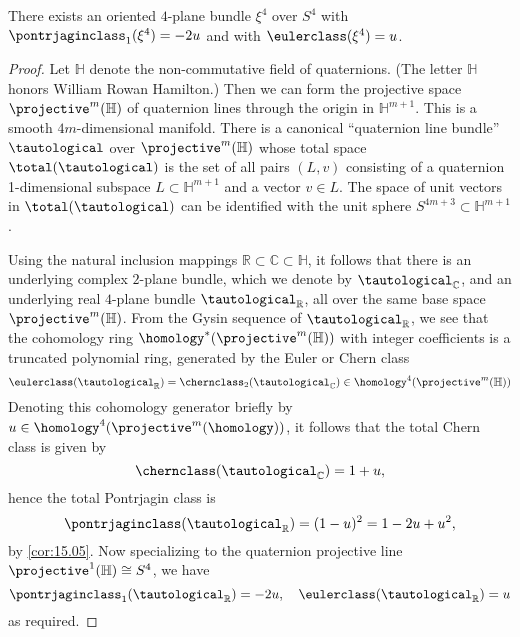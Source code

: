 \documentclass[../main]{subfiles}
\begin{document}
\begin{lemma}\label{lem:20.09}
There exists an oriented $4$-plane bundle $\xi^{4}$ over $S^{4}$ with\newline $\pontrjaginclass_{1}(\xi^{4})=-2 u$ and with $\eulerclass(\xi^{4})=u$.
\end{lemma} 
\begin{proof} Let $\mathbb{H}$ denote the non-commutative field of quaternions. (The letter $\mathbb{H}$ honors William Rowan Hamilton.) Then we can form the projective space $\projective^{m}(\mathbb{H})$ of quaternion lines through the origin in $\mathbb{H}^{m+1}$. This is a smooth $4 m$-dimensional manifold. There is a canonical ``quaternion line bundle'' $\tautological$ over $\projective^{m}(\mathbb{H})$ whose total space $\total(\tautological)$ is the set of all pairs $(L, v)$ consisting of a quaternion 1-dimensional subspace $L \subset \mathbb{H}^{m+1}$ and a vector $v \in L$. The space of unit vectors in $\total(\tautological)$ can be identified with the unit sphere $S^{4 m+3} \subset \mathbb{H}^{m+1}$.

Using the natural inclusion mappings $\mathbb{R} \subset \mathbb{C} \subset \mathbb{H}$, it follows that there is an underlying complex $2$-plane bundle, which we denote by $\tautological_{\mathbb{C}}$, and an underlying real $4$-plane bundle $\tautological_{\mathbb{R}}$, all over the same base space $\projective^{m}(\mathbb{H})$. From the Gysin sequence of $\tautological_{\mathbb{R}}$, we see that the cohomology ring $\homology^{*}(\projective^{m}(\mathbb{H}))$ with integer coefficients is a truncated polynomial ring, generated by the Euler or Chern class
\[
\eulerclass(\tautological_{\mathbb{R}})=\chernclass_{2}(\tautological_{\mathbb{C}}) \in \homology^{4}(\projective^{m}(\mathbb{H}))
\]
Denoting this cohomology generator briefly by $u \in \homology^{4}(\projective^{m}(\homology))$, it follows that the total Chern class is given by
\[
\chernclass(\tautological_{\mathbb{C}})=1+u ,
\]
hence the total Pontrjagin class is
\[
\pontrjaginclass(\tautological_{\mathbb{R}})=(1-u)^{2}=1-2 u+u^{2},
\]
by \ref{cor:15.05}. Now specializing to the quaternion projective line $\projective^{1}(\mathbb{H}) \cong S^{4}$, we have
\[
\pontrjaginclass_{1}(\tautological_{\mathbb{R}})=-2 u, \quad \eulerclass(\tautological_{\mathbb{R}})=u
\]
as required.
\end{proof}
\end{document}
